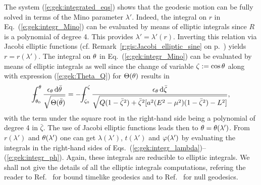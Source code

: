 The system (\ref{e:gek:integrated_eqs}) shows that the geodesic motion can be
fully solved in terms of the Mino parameter $\lambda'$. Indeed,
the integral on $r$ in Eq.~(\ref{e:gek:integr_Mino}) can be evaluated by
means of elliptic integrals since $R$ is a polynomial of degree 4. This provides
$\lambda' = \lambda'(r)$. Inverting this relation via Jacobi elliptic functions
(cf. Remark~\ref{r:gis:Jacobi_elliptic_sine} on p.~\pageref{r:gis:Jacobi_elliptic_sine})
yields $r = r(\lambda')$. The integral on $\theta$ in Eq.~(\ref{e:gek:integr_Mino})
can be evaluated by means of elliptic integrals as well since the change of variable
$\zeta := \cos\theta$ along with expression (\ref{e:gek:Theta_Q}) for $\Theta(\theta)$ results in
\[
\dashint_{\th_0}^\th \frac{\eps_\th \, \D \bar{\th}}{\sqrt{\Theta(\bar{\th})}}
= - \dashint_{\zeta_0}^\zeta
\frac{\eps_\th \, \D \bar{\zeta}}{\sqrt{Q(1-\bar{\zeta}^2) + \bar{\zeta}^2[a^2(E^2-\mu^2)(1-\bar{\zeta}^2) - L^2]}} ,
\]
with the term under the square root in the right-hand side being a polynomial of degree 4
in $\bar{\zeta}$.
The use of Jacobi elliptic functions leads then to $\theta = \theta(\lambda')$.
From $r(\lambda')$ and $\theta(\lambda')$ one can get $\lambda(\lambda')$,
$t(\lambda')$ and $\varphi(\lambda')$
by evaluating the integrals in the right-hand sides of
Eqs.~(\ref{e:gek:integr_lambda})--(\ref{e:gek:integr_ph}). Again, these integrals are
reducible to elliptic integrals. We shall not give the details of all the
elliptic integrals computations, refering the reader to Ref.~\cite{FujitH09}
for bound timelike geodesics and to Ref.~\cite{GrallaL20b} for null geodesics.




